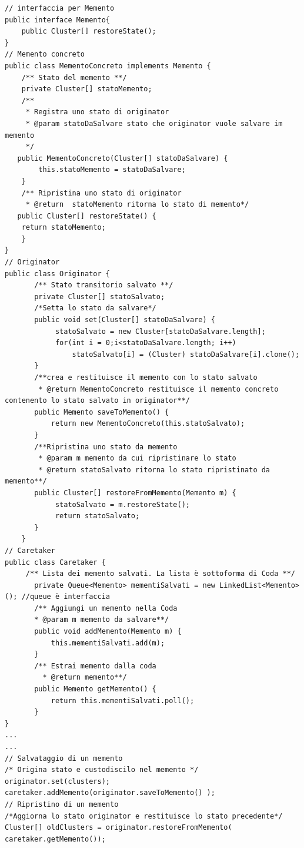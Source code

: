 \documentclass[a4paper, oneside]{book}
\begin{document}
\begin{lstlisting}
// interfaccia per Memento
public interface Memento{
	public Cluster[] restoreState();
}
// Memento concreto
public class MementoConcreto implements Memento {
	/** Stato del memento **/
   	private Cluster[] statoMemento;
   	/**
   	 * Registra uno stato di originator
   	 * @param statoDaSalvare stato che originator vuole salvare im memento
   	 */
   public MementoConcreto(Cluster[] statoDaSalvare) { 
		this.statoMemento = statoDaSalvare; 
	}
  	/** Ripristina uno stato di originator
  	 * @return  statoMemento ritorna lo stato di memento*/
   public Cluster[] restoreState() { 
	return statoMemento; 
	}
}
// Originator
public class Originator {
	   /** Stato transitorio salvato **/
	   private Cluster[] statoSalvato;
	   /*Setta lo stato da salvare*/
	   public void set(Cluster[] statoDaSalvare) { 
			statoSalvato = new Cluster[statoDaSalvare.length];
			for(int i = 0;i<statoDaSalvare.length; i++)
				statoSalvato[i] = (Cluster) statoDaSalvare[i].clone();
	   }
	   /**crea e restituisce il memento con lo stato salvato
	    * @return MementoConcreto restituisce il memento concreto contenento lo stato salvato in originator**/
	   public Memento saveToMemento() { 
	       return new MementoConcreto(this.statoSalvato); 
	   }
	   /**Ripristina uno stato da memento
	    * @param m memento da cui ripristinare lo stato
	    * @return statoSalvato ritorna lo stato ripristinato da memento**/
	   public Cluster[] restoreFromMemento(Memento m) {
			statoSalvato = m.restoreState(); 
		    return statoSalvato;
	   }
	}  
// Caretaker
public class Caretaker {
	 /** Lista dei memento salvati. La lista è sottoforma di Coda **/
	   private Queue<Memento> mementiSalvati = new LinkedList<Memento>(); //queue è interfaccia
	   /** Aggiungi un memento nella Coda 
	   * @param m memento da salvare**/
	   public void addMemento(Memento m) { 
		   this.mementiSalvati.add(m); 
	   }
	   /** Estrai memento dalla coda
		 * @return memento**/
	   public Memento getMemento() { 
		   return this.mementiSalvati.poll(); 
	   }
}   
...    	
...
// Salvataggio di un memento
/* Origina stato e custodiscilo nel memento */
originator.set(clusters);
caretaker.addMemento(originator.saveToMemento() );
// Ripristino di un memento
/*Aggiorna lo stato originator e restituisce lo stato precedente*/
Cluster[] oldClusters = originator.restoreFromMemento( caretaker.getMemento());
\end{lstlisting}



\newpage
\end{document}
